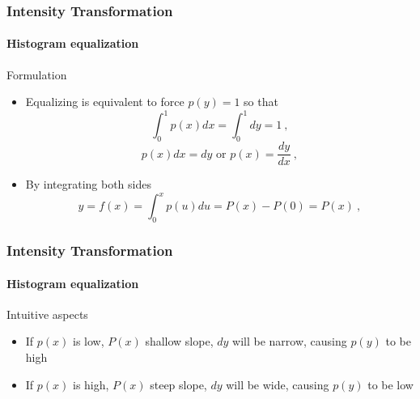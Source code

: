 \documentclass[table]{beamer}
\begin{document}
\begin{frame}
  \frametitle{Intensity Transformation}
  \framesubtitle{Histogram equalization}
  \begin{block}{Formulation}\footnotesize
    \begin{itemize}
      \item Equalizing is equivalent to force $p(y)=1$ so that
        \begin{equation}\label{eq:eq2}
          \int_{0}^{1} p(x)dx = \int_{0}^{1} dy = 1 \ ,
        \end{equation}
        \begin{equation}\label{eq:eq3}
          p(x)dx = dy \text{ or } p(x)=\frac{dy}{dx} \ ,
        \end{equation}
      \item By integrating both sides
        \begin{equation}\label{eq:eq4}
          y = f(x) = \int_{0}^{x} p(u)du = P(x) - P(0) = P(x) \ ,
        \end{equation}
    \end{itemize}
  \end{block}
\end{frame}

\begin{frame}
  \frametitle{Intensity Transformation}
  \framesubtitle{Histogram equalization}
  \begin{block}{Intuitive aspects}\footnotesize
    \begin{itemize}
      \item If $p(x)$ is low, $P(x)$ shallow slope, $dy$ will be narrow, causing $p(y)$ to be high
      \item If $p(x)$ is high, $P(x)$ steep slope, $dy$ will be wide, causing $p(y)$ to be low
    \end{itemize}
  \end{block}
\end{frame}
\end{document}
